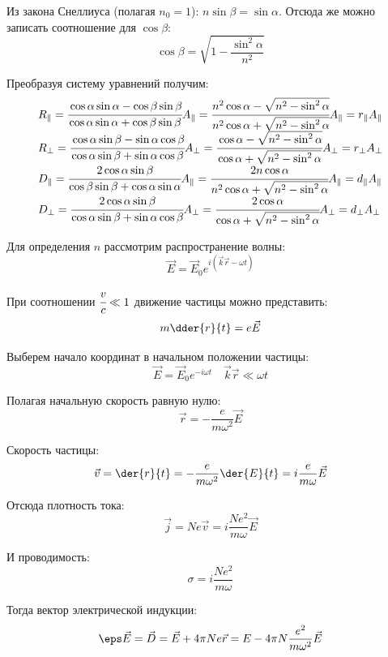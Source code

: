 Из закона Снеллиуса (полагая \( n_0 = 1 \)): \( n\sin\beta = \sin\alpha \). 
Отсюда же можно записать соотношение для \( \cos\beta \):
\[
	\cos\beta = \sqrt{1-\frac{\sin^2\alpha}{n^2}}
\]

Преобразуя систему уравнений получим:
\[
	\begin{array}{ll}
		R_{\Vert} = \cfrac{\cos\alpha\sin\alpha - \cos\beta\sin\beta}
			{\cos\alpha\sin\alpha + \cos\beta\sin\beta}A_{\Vert} = 
			\cfrac{n^2\cos\alpha - \sqrt{n^2-\sin^2\alpha}}
			{n^2\cos\alpha + \sqrt{n^2-\sin^2\alpha}} A_{\Vert} = 
			r_{\Vert} A_{\Vert} \\
		R_{\bot} = \cfrac{\cos\alpha\sin\beta - \sin\alpha\cos\beta}
			{\cos\alpha\sin\beta + \sin\alpha\cos\beta}A_{\bot} = 
			\cfrac{\cos\alpha - \sqrt{n^2-\sin^2\alpha}}
			{\cos\alpha + \sqrt{n^2-\sin^2\alpha}}A_{\bot} = 
			r_{\bot} A_{\bot} \\
		D_{\Vert} = \cfrac{2\cos\alpha\sin\beta}
			{\cos\beta\sin\beta + \cos\alpha\sin\alpha}A_{\Vert} = 
			\cfrac{2n\cos\alpha}{n^2\cos\alpha + \sqrt{n^2-\sin^2\alpha}}
			A_{\Vert} = d_{\Vert} A_{\Vert} \\
		D_{\bot} = \cfrac{2\cos\alpha\sin\beta}
			{\cos\alpha\sin\beta + \sin\alpha\cos\beta}A_{\bot} =
			\cfrac{2\cos\alpha}{\cos\alpha + \sqrt{n^2-\sin^2\alpha}}
			A_{\bot} = d_{\bot} A_{\bot}
	\end{array}
\]

Для определения \( n \) рассмотрим распространение волны:
\[
	\vec{E} = \vec{E}_0 e^{i(\vec{k}\vec{r} - \omega t)}
\]

При соотношении \( \cfrac{v}{c} \ll 1 \) движение частицы можно представить:
\[
	m\dder{r}{t} = e\vec{E}
\]

Выберем начало координат в начальном положении частицы:
\[
	\vec{E} = \vec{E}_0 e^{-i\omega t} \quad \vec{k}\vec{r} \ll \omega t
\]

Полагая начальную скорость равную нулю:
\[
	\vec{r} = -\frac{e}{m\omega^2}\vec{E}
\]

Скорость частицы:
\[
	\vec{v} = \der{r}{t} = -\frac{e}{m\omega^2}\der{E}{t} = i\frac{e}{m\omega}\vec{E}
\]

Отсюда плотность тока:
\[
	\vec{j} = Ne\vec{v} = i\frac{Ne^2}{m\omega}\vec{E}
\]

И проводимость:
\[
	\sigma = i\frac{Ne^2}{m\omega}
\]

Тогда вектор электрической индукции:
\[
	\eps\vec{E} = \vec{D} = \vec{E} + 4\pi N e \vec{r} = 
		E - 4\pi N \frac{e^2}{m\omega^2}\vec{E} 
\]

